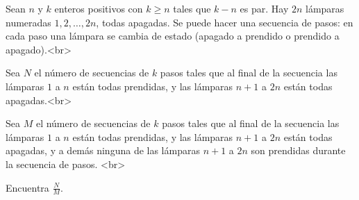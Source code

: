 Sean $n$ y $k$ enteros positivos con $k\geq n$ tales que $k-n$ es par. Hay $2n$ lámparas numeradas $1,2,\dots,2n$, todas apagadas. Se puede hacer una secuencia de pasos: en cada paso una lámpara se cambia de estado (apagado a prendido o prendido a apagado).<br>

Sea $N$ el número de secuencias de $k$ pasos tales que al final de la secuencia las lámparas $1$ a $n$ están todas prendidas, y las lámparas $n+1$ a $2n$ están todas apagadas.<br>

Sea $M$ el número de secuencias de $k$ pasos tales que al final de la secuencia las lámparas $1$ a $n$ están todas prendidas, y las lámparas $n+1$ a $2n$ están todas apagadas, y a demás ninguna de las lámparas $n+1$ a $2n$ son prendidas durante la secuencia de pasos. <br>

Encuentra $\frac{N}{M}$.